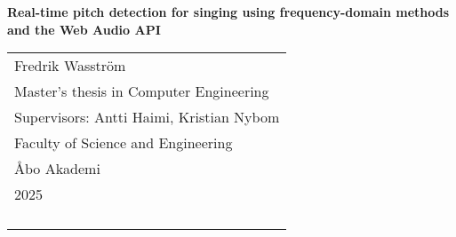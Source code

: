
\begin{titlepage}
\vspace*{144pt}
\begin{center}
\Huge\bf Real-time pitch detection for singing using frequency-domain methods and the Web Audio API
\end{center}
\enlargethispage{3cm}
\vfill

\hfill
\begin{tabular}[t]{l@{}}%
Fredrik Wasström\\ 
Master's thesis in Computer Engineering\\ 
Supervisors: Antti Haimi, Kristian Nybom \\
Faculty of Science and Engineering \\
Åbo Akademi\\ 
2025\\ 
\\
\\
\\
\\
\end{tabular}
\end{titlepage}

